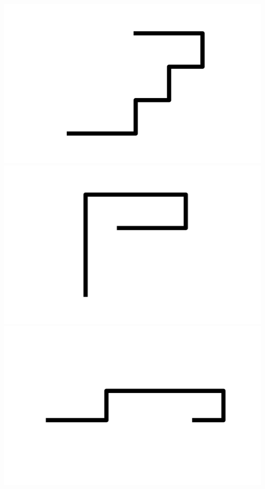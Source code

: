 \documentclass[]{report}
\begin{document}
\includegraphics[scale=.1]{pictures/21/state_cluster_shapes_430.pdf} 
\includegraphics[scale=.1]{pictures/21/state_cluster_shapes_431.pdf} 
\includegraphics[scale=.1]{pictures/21/state_cluster_shapes_432.pdf} 
\end{document}
